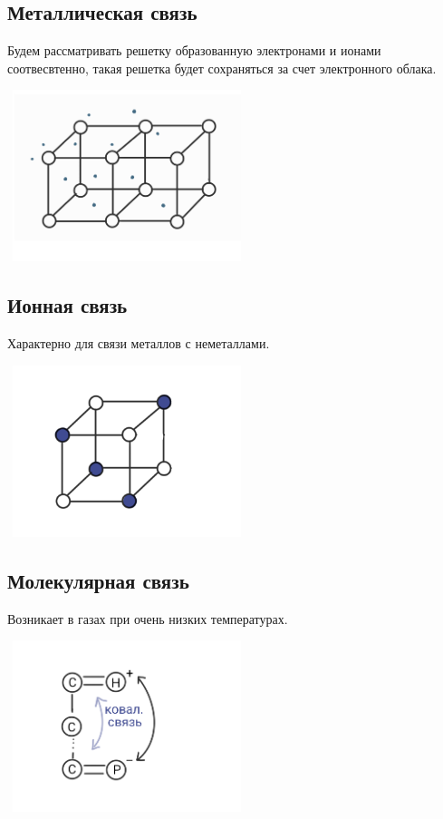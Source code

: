 \documentclass[../main.tex]{subfiles}
\begin{document}
\subsection{Металлическая связь}
Будем рассматривать решетку образованную электронами и ионами соотвесвтенно, такая решетка будет сохраняться за счет электронного облака.
\begin{center}
    \includegraphics[height=5cm, width=7cm]{../img/kvantovy1.png}
\end{center}
\subsection{Ионная связь}
Характерно для связи металлов с неметаллами.
\begin{center}
    \includegraphics[height=5cm, width=7cm]{../img/kvantovy3.png}
\end{center}
\subsection{Молекулярная связь}
Возникает в газах при очень низких температурах.
\begin{center}
    \includegraphics[height=5cm, width=7cm]{../img/kvantovy4.png}
\end{center}
\end{document}
